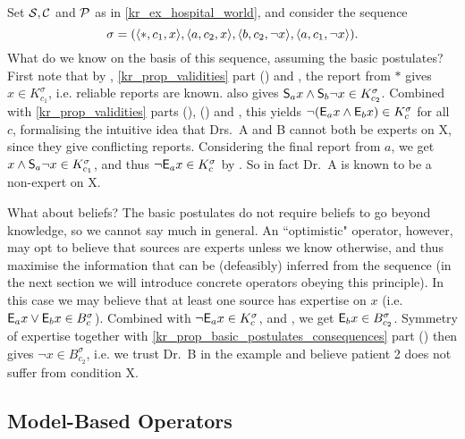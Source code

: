 \begin{example}
    \label{kr_ex_hospital_ex_formalised}
    Set $\srcs, \C$ and $\propvars$ as in \cref{kr_ex_hospital_world}, and consider
    the sequence
    \[
        \sigma
        = (
            \tuple{\ast, c_1, x},
            \tuple{a, c_2, x},
            \tuple{b, c_2, \neg x},
            \tuple{a, c_1, \neg x}
        ).
    \]
    What do we know on the basis of this sequence, assuming the basic
    postulates? First note that by \soundness{}, \cref{kr_prop_validities}
    part () and \closure{}, the report from $\ast$ gives $x
    \in K^\sigma_{c_1}$, i.e. reliable reports are known. \soundness{} also
    gives $\S_a{x} \land \S_b{\neg x} \in K^\sigma_{c_2}$. Combined with
    \cref{kr_prop_validities} parts (),
    () and \closure{}, this yields
    $\neg(\E_a{x} \land \E_b{x}) \in K^\sigma_c$ for all $c$, formalising the
    intuitive idea that Drs.\ A and B cannot both be experts on X, since they
    give conflicting reports.
    Considering the final report from $a$, we get $x \land \S_a{\neg x} \in
    K^\sigma_{c_1}$, and thus $\neg \E_a{x} \in K^\sigma_c$ by
    \closure{}. So in fact Dr.\ A is known to be a non-expert on X.

    What about beliefs? The basic postulates do not require beliefs to go
    beyond knowledge, so we cannot say much in general. An ``optimistic"
    operator, however, may opt to believe that sources are experts unless we
    know otherwise, and thus maximise the information that can be (defeasibly)
    inferred from the sequence (in the next section we will introduce
    concrete operators obeying this principle). In this case we may believe
    that at least one source has expertise on $x$ (i.e. $\E_a{x} \lor \E_b{x} \in
    B^\sigma_c$).  Combined with $\neg \E_a{x} \in K^\sigma_c$, \closure{} and
    \containment{}, we get $\E_b{x} \in B^\sigma_{c_2}$. Symmetry of expertise
    together with \cref{kr_prop_basic_postulates_consequences} part
    () then gives $\neg x \in
    B^\sigma_{c_2}$, i.e. we trust Dr.\ B in the example and believe patient 2
    does not suffer from condition X.

\end{example}

\subsection{Model-Based Operators}

